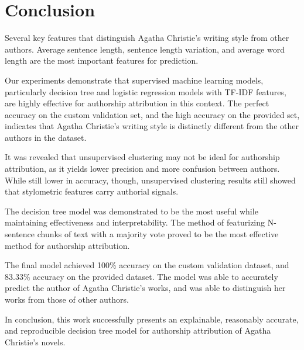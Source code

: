 \documentclass[journal]{IEEEtran} %
\begin{document}
\section{Conclusion}

Several key features that distinguish Agatha Christie's writing style from other authors. Average sentence length, sentence length variation, and average word length are the most important features for prediction.

Our experiments demonstrate that supervised machine learning models, particularly decision tree and logistic regression models with TF-IDF features, are highly effective for authorship attribution in this context. The perfect accuracy on the custom validation set, and the high accuracy on the provided set, indicates that Agatha Christie's writing style is distinctly different from the other authors in the dataset.

It was revealed that unsupervised clustering may not be ideal for authorship attribution, as it yields lower precision and more confusion between authors.
While still lower in accuracy, though, unsupervised clustering results still showed that stylometric features carry authorial signals.

The decision tree model was demonstrated to be the most useful while maintaining effectiveness and interpretability. The method of featurizing N-sentence chunks of text with a majority vote proved to be the most effective method for authorship attribution.

The final model achieved 100\% accuracy on the custom validation dataset, and 83.33\% accuracy on the provided dataset. The model was able to accurately predict the author of Agatha Christie's works, and was able to distinguish her works from those of other authors. 

In conclusion, this work successfully presents an explainable, reasonably accurate, and reproducible decision tree model for authorship attribution of Agatha Christie's novels.

\end{document}
